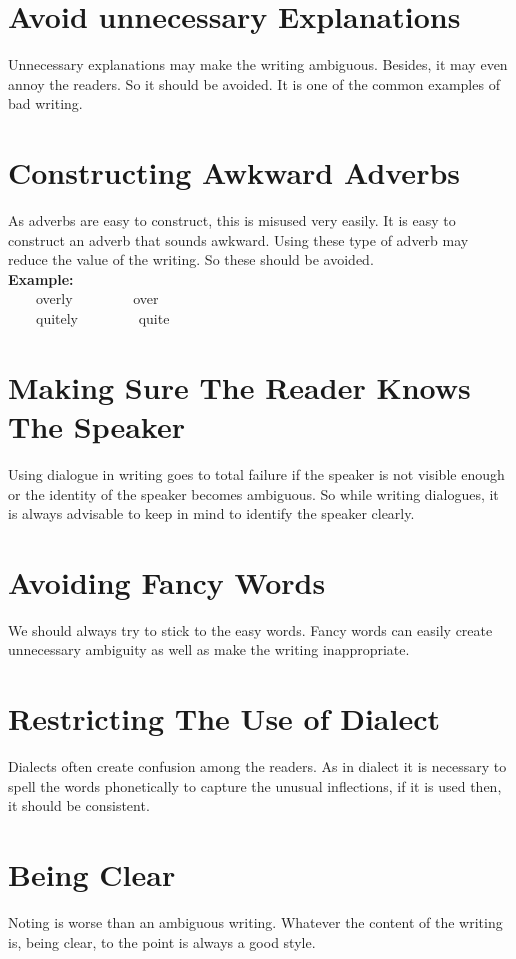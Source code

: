 \documentclass[12pt]{report}
\newcommand{\xmpl}{\textbf{Example:}\\} %
\newcommand{\indnt}{\ \ \ \ } %
\begin{document}
\section{Avoid unnecessary Explanations}
Unnecessary explanations may make the writing ambiguous. Besides, it may even annoy the readers. So it should be avoided. It is one of the common examples of bad writing.


\section{Constructing Awkward Adverbs}
As adverbs are easy to construct, this is misused very easily. It is easy to construct an adverb that sounds awkward. Using these type of adverb may reduce the value of the writing. So these should be avoided.\\
\xmpl
\indnt overly \indnt \indnt over\\
\indnt quitely \indnt \indnt quite\\


\section{Making Sure The Reader Knows The Speaker}
Using dialogue in writing goes to total failure if the speaker is not visible enough or the identity of the speaker becomes ambiguous.
So while writing dialogues, it is always advisable to keep in mind to identify the speaker clearly.


\section{Avoiding Fancy Words}
We should always try to stick to the easy words. Fancy words can easily create unnecessary ambiguity as well as make the writing inappropriate.


\section{Restricting The Use of Dialect}
Dialects often create confusion among the readers. As in dialect it is necessary to spell the words phonetically to capture the unusual inflections, if it is used then, it should be consistent.


\section{Being Clear}
Noting is worse than an ambiguous writing. Whatever the content of the writing is, being clear, to the point is always a good style.
\end{document}
